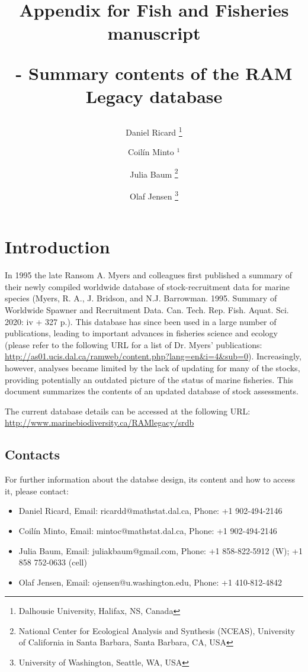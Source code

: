 \documentclass[a4paper,10pt,oneside]{book}
\author{Daniel Ricard \thanks{Dalhousie University, Halifax, NS, Canada} \and Coil\'{i}n Minto $^{1}$  \and Julia Baum \thanks{National Center for Ecological Analysis and Synthesis (NCEAS), University of California in Santa Barbara, Santa Barbara, CA, USA} \and Olaf Jensen \thanks{University of Washington, Seattle, WA, USA}}
\title{\begin{LARGE}Appendix for Fish and Fisheries manuscript\end{LARGE} - Summary contents of the RAM Legacy database} %
\begin{document}
\maketitle
\tableofcontents

\chapter{Introduction}

In 1995 the late Ransom A. Myers and colleagues first published a summary of their newly compiled worldwide database of stock-recruitment data for marine species (Myers, R. A., J. Bridson, and N.J. Barrowman. 1995. Summary of Worldwide Spawner and Recruitment Data. Can. Tech. Rep. Fish. Aquat. Sci. 2020: iv + 327 p.). This database has since been used in a large number of publications, leading to important advances in fisheries science and ecology (please refer to the following URL for a list of Dr. Myers' publications: \url{http://as01.ucis.dal.ca/ramweb/content.php?lang=en&i=4&sub=0}). Increasingly, however, analyses became limited by the lack of updating for many of the stocks, providing potentially an outdated picture of the status of marine fisheries. This document summarizes the contents of an updated database of stock assessments.



\vspace{0.3cm}
%

The current database details can be accessed at the following URL:
\url{http://www.marinebiodiversity.ca/RAMlegacy/srdb}

\newpage



\section{Contacts}

For further information about the databse design, its content and how to access it, please contact:
\begin{itemize}
 \item Daniel Ricard, Email: ricardd@mathstat.dal.ca, Phone: +1 902-494-2146
 \item Coil\'{i}n Minto, Email: mintoc@mathstat.dal.ca, Phone: +1 902-494-2146
 \item Julia Baum, Email: juliakbaum@gmail.com, Phone: +1 858-822-5912 (W); +1 858 752-0633 (cell)
 \item Olaf Jensen, Email: ojensen@u.washington.edu, Phone: +1 410-812-4842

\end{itemize}
\end{document}
